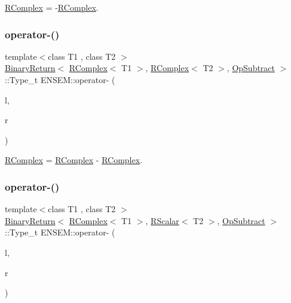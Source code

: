\mbox{\hyperlink{classENSEM_1_1RComplex}{R\+Complex}} = -\/\mbox{\hyperlink{classENSEM_1_1RComplex}{R\+Complex}}. 

\mbox{\label{group__rcomplex_ga49dbda9bd7d00d928595979502979d9b}} 
\subsubsection{\texorpdfstring{operator-\/()}{operator-()}\hspace{0.1cm}{\footnotesize\ttfamily [2/4]}}
{\footnotesize\ttfamily template$<$class T1 , class T2 $>$ \\
\mbox{\hyperlink{structENSEM_1_1BinaryReturn}{Binary\+Return}}$<$ \mbox{\hyperlink{classENSEM_1_1RComplex}{R\+Complex}}$<$ T1 $>$, \mbox{\hyperlink{classENSEM_1_1RComplex}{R\+Complex}}$<$ T2 $>$, \mbox{\hyperlink{structENSEM_1_1OpSubtract}{Op\+Subtract}} $>$\+::Type\+\_\+t E\+N\+S\+E\+M\+::operator-\/ (\begin{DoxyParamCaption}\item[{const \mbox{\hyperlink{classENSEM_1_1RComplex}{R\+Complex}}$<$ T1 $>$ \&}]{l,  }\item[{const \mbox{\hyperlink{classENSEM_1_1RComplex}{R\+Complex}}$<$ T2 $>$ \&}]{r }\end{DoxyParamCaption})\hspace{0.3cm}{\ttfamily [inline]}}



\mbox{\hyperlink{classENSEM_1_1RComplex}{R\+Complex}} = \mbox{\hyperlink{classENSEM_1_1RComplex}{R\+Complex}} -\/ \mbox{\hyperlink{classENSEM_1_1RComplex}{R\+Complex}}. 

\mbox{\label{group__rcomplex_ga9ea00fde5e26657fc53ca42c40fa6618}} 
\subsubsection{\texorpdfstring{operator-\/()}{operator-()}\hspace{0.1cm}{\footnotesize\ttfamily [3/4]}}
{\footnotesize\ttfamily template$<$class T1 , class T2 $>$ \\
\mbox{\hyperlink{structENSEM_1_1BinaryReturn}{Binary\+Return}}$<$ \mbox{\hyperlink{classENSEM_1_1RComplex}{R\+Complex}}$<$ T1 $>$, \mbox{\hyperlink{classENSEM_1_1RScalar}{R\+Scalar}}$<$ T2 $>$, \mbox{\hyperlink{structENSEM_1_1OpSubtract}{Op\+Subtract}} $>$\+::Type\+\_\+t E\+N\+S\+E\+M\+::operator-\/ (\begin{DoxyParamCaption}\item[{const \mbox{\hyperlink{classENSEM_1_1RComplex}{R\+Complex}}$<$ T1 $>$ \&}]{l,  }\item[{const \mbox{\hyperlink{classENSEM_1_1RScalar}{R\+Scalar}}$<$ T2 $>$ \&}]{r }\end{DoxyParamCaption})\hspace{0.3cm}{\ttfamily [inline]}}



